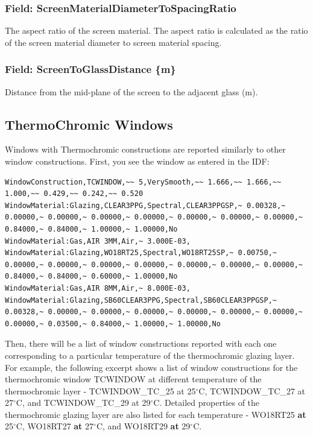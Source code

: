 \subsubsection{Field: ScreenMaterialDiameterToSpacingRatio}\label{field-screenmaterialdiametertospacingratio}

The aspect ratio of the screen material. The aspect ratio is calculated as the ratio of the screen material diameter to screen material spacing.

\subsubsection{Field: ScreenToGlassDistance \{m\}}\label{field-screentoglassdistance-m}

Distance from the mid-plane of the screen to the adjacent glass (m).

\subsection{ThermoChromic Windows}\label{thermochromic-windows}

Windows with Thermochromic constructions are reported similarly to other window constructions. First, you see the window as entered in the IDF:

\begin{lstlisting}
WindowConstruction,TCWINDOW,~~ 5,VerySmooth,~~ 1.666,~~ 1.666,~~ 1.000,~~ 0.429,~~ 0.242,~~ 0.520
WindowMaterial:Glazing,CLEAR3PPG,Spectral,CLEAR3PPGSP,~ 0.00328,~ 0.00000,~ 0.00000,~ 0.00000,~ 0.00000,~ 0.00000,~ 0.00000,~ 0.00000,~ 0.84000,~ 0.84000,~ 1.00000,~ 1.00000,No
WindowMaterial:Gas,AIR 3MM,Air,~ 3.000E-03,
WindowMaterial:Glazing,WO18RT25,Spectral,WO18RT25SP,~ 0.00750,~ 0.00000,~ 0.00000,~ 0.00000,~ 0.00000,~ 0.00000,~ 0.00000,~ 0.00000,~ 0.84000,~ 0.84000,~ 0.60000,~ 1.00000,No
WindowMaterial:Gas,AIR 8MM,Air,~ 8.000E-03,
WindowMaterial:Glazing,SB60CLEAR3PPG,Spectral,SB60CLEAR3PPGSP,~ 0.00328,~ 0.00000,~ 0.00000,~ 0.00000,~ 0.00000,~ 0.00000,~ 0.00000,~ 0.00000,~ 0.03500,~ 0.84000,~ 1.00000,~ 1.00000,No
\end{lstlisting}

Then, there will be a list of window constructions reported with each one corresponding to a particular temperature of the thermochromic glazing layer. For example, the following excerpt shows a list of window constructions for the thermochromic window TCWINDOW at different temperature of the thermochromic layer - TCWINDOW\_TC\_25 at 25$^{\circ}$C, TCWINDOW\_TC\_27 at 27$^{\circ}$C, and TCWINDOW\_TC\_29 at 29$^{\circ}$C. Detailed properties of the thermochromic glazing layer are also listed for each temperature - WO18RT25 \textbf{at} 25$^{\circ}$C, WO18RT27 \textbf{at} 27$^{\circ}$C, and WO18RT29 \textbf{at} 29$^{\circ}$C.

